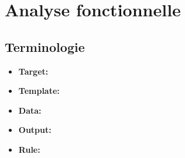 \section{Analyse fonctionnelle}

	\subsection{Terminologie}
	
		\begin{itemize}
			\item \textbf{Target:}
			\item \textbf{Template:}
			\item \textbf{Data:}
			\item \textbf{Output:}
			\item \textbf{Rule:} 
		\end{itemize}